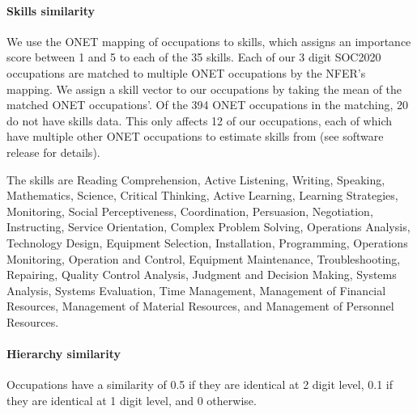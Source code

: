 \documentclass[aps,pre,floats,floatfix,superscriptaddress,twocolumn,final,10pt]{revtex4-2}
\theoremstyle{definition}
\begin{document}
\paragraph{Skills similarity} We use the ONET mapping of occupations to skills, which assigns an importance score between 1 and 5 to each of the 35 skills. Each of our 3 digit SOC2020 occupations are matched to multiple ONET occupations by the NFER's mapping. We assign a skill vector to our occupations by taking the mean of the matched ONET occupations'. Of the 394 ONET occupations in the matching, 20 do not have skills data. This only affects 12 of our occupations, each of which have multiple other ONET occupations to estimate skills from (see software release for details).

The skills are Reading Comprehension, Active Listening, Writing, Speaking, Mathematics, Science, Critical Thinking, Active Learning, Learning Strategies, Monitoring, Social Perceptiveness, Coordination, Persuasion, Negotiation, Instructing, Service Orientation, Complex Problem Solving, Operations Analysis, Technology Design, Equipment Selection, Installation, Programming, Operations Monitoring, Operation and Control, Equipment Maintenance, Troubleshooting, Repairing, Quality Control Analysis, Judgment and Decision Making, Systems Analysis, Systems Evaluation, Time Management, Management of Financial Resources, Management of Material Resources, and Management of Personnel Resources.



\paragraph{Hierarchy similarity} Occupations have a similarity of 0.5 if they are identical at 2 digit level, 0.1 if they are identical at 1 digit level, and 0 otherwise.
\end{document}
